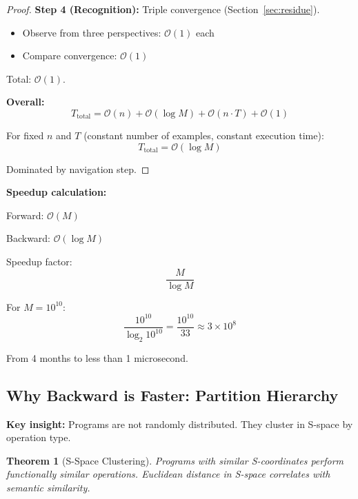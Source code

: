 \documentclass[twocolumn,10pt]{article}
\newtheorem{theorem}{Theorem}[section]
\theoremstyle{definition}
\theoremstyle{remark}
\newcommand{\bigO}{\mathcal{O}}
\begin{document}
\begin{proof}
\vspace{0.2cm}
\noindent\textbf{Step 4 (Recognition):} Triple convergence (Section~\ref{sec:residue}).
\begin{itemize}
\item Observe from three perspectives: $\bigO(1)$ each
\item Compare convergence: $\bigO(1)$
\end{itemize}
Total: $\bigO(1)$.

\vspace{0.2cm}
\noindent\textbf{Overall:}
\begin{equation}
T_{\text{total}} = \bigO(n) + \bigO(\log M) + \bigO(n \cdot T) + \bigO(1)
\end{equation}

For fixed $n$ and $T$ (constant number of examples, constant execution time):
\begin{equation}
T_{\text{total}} = \bigO(\log M)
\end{equation}

Dominated by navigation step.
\end{proof}

\vspace{0.2cm}
\noindent\textbf{Speedup calculation:}

Forward: $\bigO(M)$

Backward: $\bigO(\log M)$

Speedup factor:
\begin{equation}
\frac{M}{\log M}
\end{equation}

For $M = 10^{10}$:
\begin{equation}
\frac{10^{10}}{\log_2 10^{10}} = \frac{10^{10}}{33} \approx 3 \times 10^8
\end{equation}

From 4 months to less than 1 microsecond.

\subsection{Why Backward is Faster: Partition Hierarchy}

\textbf{Key insight:} Programs are not randomly distributed. They cluster in S-space by operation type.

\begin{theorem}[S-Space Clustering]
\label{thm:clustering}
Programs with similar S-coordinates perform functionally similar operations. Euclidean distance in S-space correlates with semantic similarity.
\end{theorem}
\end{document}
